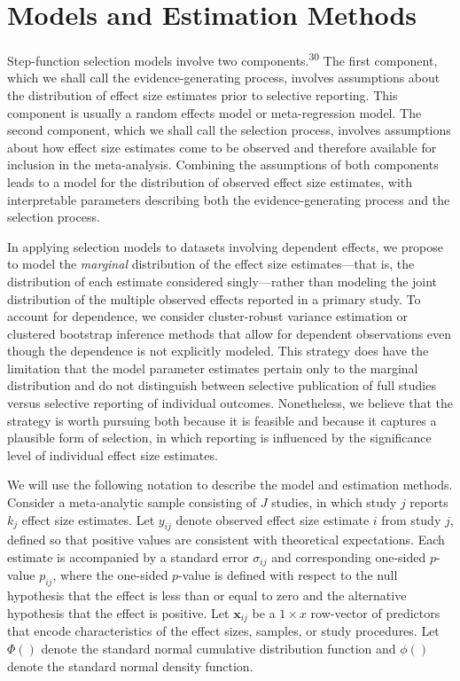 \documentclass[
  american,
  man, donotrepeattitle,floatsintext]{apa7}
\begin{document}
\section{Models and Estimation Methods}\label{model-and-estimation}

Step-function selection models involve two components.\textsuperscript{30}
The first component, which we shall call the evidence-generating process, involves assumptions about the distribution of effect size estimates prior to selective reporting.
This component is usually a random effects model or meta-regression model.
The second component, which we shall call the selection process, involves assumptions about how effect size estimates come to be observed and therefore available for inclusion in the meta-analysis.
Combining the assumptions of both components leads to a model for the distribution of observed effect size estimates, with interpretable parameters describing both the evidence-generating process and the selection process.

In applying selection models to datasets involving dependent effects, we propose to model the \emph{marginal} distribution of the effect size estimates---that is, the distribution of each estimate considered singly---rather than modeling the joint distribution of the multiple observed effects reported in a primary study.
To account for dependence, we consider cluster-robust variance estimation or clustered bootstrap inference methods that allow for dependent observations even though the dependence is not explicitly modeled.
This strategy does have the limitation that the model parameter estimates pertain only to the marginal distribution and do not distinguish between selective publication of full studies versus selective reporting of individual outcomes.
Nonetheless, we believe that the strategy is worth pursuing both because it is feasible and because it captures a plausible form of selection, in which reporting is influenced by the significance level of individual effect size estimates.

We will use the following notation to describe the model and estimation methods. Consider a meta-analytic sample consisting of \(J\) studies, in which study \(j\) reports \(k_j\) effect size estimates. Let \(y_{ij}\) denote observed effect size estimate \(i\) from study \(j\), defined so that positive values are consistent with theoretical expectations. Each estimate is accompanied by a standard error \(\sigma_{ij}\) and corresponding one-sided \(p\)-value \(p_{ij}\), where the one-sided \(p\)-value is defined with respect to the null hypothesis that the effect is less than or equal to zero and the alternative hypothesis that the effect is positive. Let \(\mathbf{x}_{ij}\) be a \(1 \times x\) row-vector of predictors that encode characteristics of the effect sizes, samples, or study procedures. Let \(\Phi()\) denote the standard normal cumulative distribution function and \(\phi()\) denote the standard normal density function.
\end{document}
